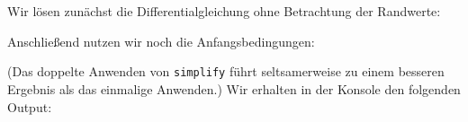 \section{}

Wir lösen zunächst die Differentialgleichung ohne Betrachtung der Randwerte:



Anschließend nutzen wir noch die Anfangsbedingungen:



(Das doppelte Anwenden von \texttt{simplify} führt seltsamerweise zu einem besseren Ergebnis als das einmalige Anwenden.)
Wir erhalten in der Konsole den folgenden Output:

